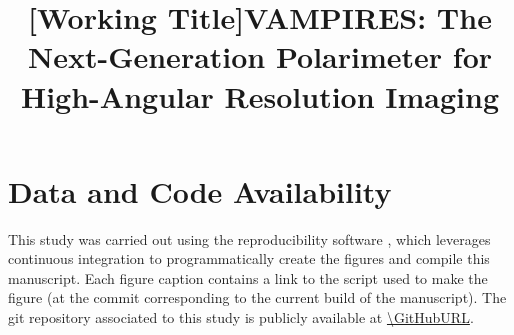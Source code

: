\documentclass[twocolumn]{aastex631}
\begin{document}
\title{[Working Title]VAMPIRES: The Next-Generation Polarimeter for High-Angular Resolution Imaging}

\begin{abstract}
    
\end{abstract}













\software{}



\appendix



\section{Data and Code Availability}
This study was carried out using the reproducibility software \href{https://github.com/showyourwork/showyourwork}{\showyourwork} \citep{luger_mapping_2021}, which leverages continuous integration to programmatically create the figures and compile this manuscript. Each figure caption contains a link to the script used to make the figure (at the commit corresponding to the current build of the manuscript). The git repository associated to this study is publicly available at \url{\GitHubURL}.
\end{document}
